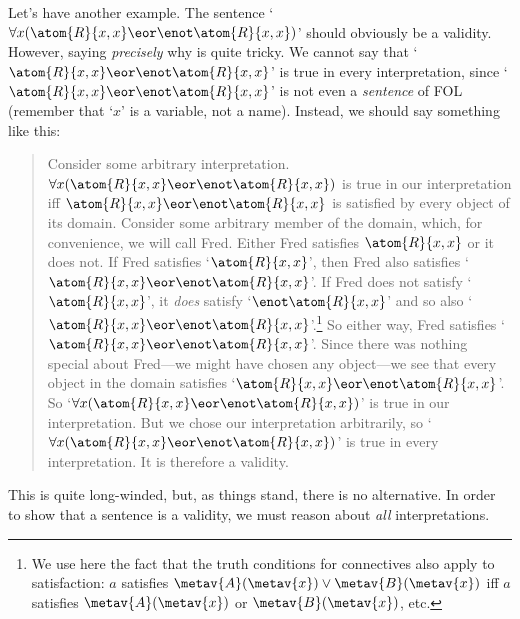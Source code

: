 Let's have another example. The sentence `$\forall x(\atom{R}{x,x}\eor\enot \atom{R}{x,x})$' should obviously be a validity. However, saying \emph{precisely} why is quite tricky. We cannot say that `$\atom{R}{x,x} \eor\enot \atom{R}{x,x}$' is true in every interpretation, since `$\atom{R}{x,x} \eor\enot \atom{R}{x,x}$' is not even a \emph{sentence} of FOL (remember that `$x$' is a variable, not a name). Instead, we should say something like this:
	\begin{quote}
		Consider some arbitrary interpretation. $\forall x(\atom{R}{x,x}\eor \enot\atom{R}{x,x})$ is true in our interpretation iff $\atom{R}{x,x}\eor\enot\atom{R}{x,x}$ is satisfied by every object of its domain. Consider some arbitrary member of the domain, which, for convenience, we will call Fred. Either Fred satisfies $\atom{R}{x,x}$ or it does not. If Fred satisfies `$\atom{R}{x,x}$', then Fred also satisfies `$\atom{R}{x,x} \eor \enot \atom{R}{x,x}$'. If Fred does not satisfy `$\atom{R}{x,x}$', it \emph{does} satisfy `$\enot\atom{R}{x,x}$' and so also `$\atom{R}{x,x} \eor\enot \atom{R}{x,x}$'.\footnote{We use here the fact that the truth conditions for connectives also apply to satisfaction: $a$ satisfies $\metav{A}(\metav{x}) \lor \metav{B}(\metav{x})$ iff $a$ satisfies $\metav{A}(\metav{x})$ or $\metav{B}(\metav{x})$, etc.} So either way, Fred satisfies `$\atom{R}{x,x} \eor\enot \atom{R}{x,x}$'. Since there was nothing special about Fred---we might have chosen any object---we see that every object in the domain satisfies `$\atom{R}{x,x} \eor\enot \atom{R}{x,x}$'. So `$\forall x (\atom{R}{x,x} \eor\enot \atom{R}{x,x})$' is true in our interpretation. But we chose our interpretation arbitrarily, so `$\forall x (\atom{R}{x,x} \eor\enot \atom{R}{x,x})$' is true in every interpretation. It is therefore a validity.
	\end{quote}
This is quite long-winded, but, as things stand, there is no alternative. In order to show that a sentence is a validity, we must reason about \emph{all} interpretations.

